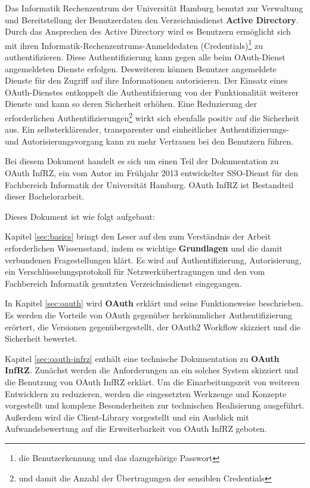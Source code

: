 \documentclass[12pt,a4paper,pointednumbers,abstracton]{scrartcl}
\newcommand{\deactivate}[1]{}
\begin{document}
Das Informatik Rechenzentrum der Universität Hamburg benutzt zur Verwaltung und Bereitstellung der Benutzerdaten den Verzeichnisdienst \textbf{Active Directory}.
Durch das Ansprechen des Active Directory wird es Benutzern ermöglicht sich mit ihren Informatik-Rechenzentrums-Anmeldedaten (Credentials)\footnote{die Benutzerkennung und das dazugehörige Passwort} zu authentifizieren.
Diese Authentifizierung kann gegen alle beim OAuth-Dienst angemeldeten Dienste erfolgen.
Desweiteren können Benutzer angemeldete Dienste für den Zugriff auf ihre Informationen autorisieren.
Der Einsatz eines OAuth-Dienstes entkoppelt die Authentifzierung von der Funktionalität weiterer Dienste und kann so deren Sicherheit erhöhen.
Eine Reduzierung der erforderlichen Authentifizierungen\footnote{und damit die Anzahl der Übertragungen der sensiblen Credentials} wirkt sich ebenfalls positiv auf die Sicherheit aus.
Ein selbsterklärender, transparenter und einheitlicher Authentifizierungs- und Autorisierungsvorgang kann zu mehr Vertrauen bei den Benutzern führen.

Bei diesem Dokument handelt es sich um einen Teil der Dokumentation zu OAuth InfRZ, ein vom Autor im Frühjahr 2013 entwickelter SSO-Dienst für den Fachbereich Informatik der Universität Hamburg.
OAuth InfRZ ist Bestandteil dieser Bachelorarbeit.

Dieses Dokument ist wie folgt aufgebaut:

\deactivate{
Kapitel \ref{sec:einleitung} liefert eine \textbf{Einleitung} in die Materie und soll OAuth InfRZ in einen Kontext bringen.
Es wird die Relevanz eines SSO-Dienstes erörtert, eine Implementierungsmöglichkeit skizziert und eine Zusammenfassung zu jedem Kapitel gegeben.
}

Kapitel \ref{sec:basics} bringt den Leser auf den zum Verständnis der Arbeit erforderlichen Wissensstand, indem es wichtige \textbf{Grundlagen} und die damit verbundenen Fragestellungen klärt.
Es wird auf Authentifizierung, Autorisierung, ein Verschlüsselungsprotokoll für Netzwerkübertragungen und den vom Fachbereich Informatik genutzten Verzeichnisdienst eingegangen.

In Kapitel \ref{sec:oauth} wird \textbf{OAuth} erklärt und seine Funktionsweise beschrieben.
Es werden die Vorteile von OAuth gegenüber herkömmlicher Authentifizierung erörtert, die Versionen gegenübergestellt, der OAuth2 Workflow skizziert und die Sicherheit bewertet.

Kapitel \ref{sec:oauth-infrz} enthält eine technische Dokumentation zu \textbf{OAuth InfRZ}.
Zunächst werden die Anforderungen an ein solches System skizziert und die Benutzung von OAuth InfRZ erklärt.
Um die Einarbeitungszeit von weiteren Entwicklern zu reduzieren, werden die eingesetzten Werkzeuge und Konzepte vorgestellt und komplexe Besonderheiten zur technischen Realisierung ausgeführt.
Außerdem wird die Client-Library vorgestellt und ein Ausblick mit Aufwandsbewertung auf die Erweiterbarkeit von OAuth InfRZ geboten.
\end{document}
